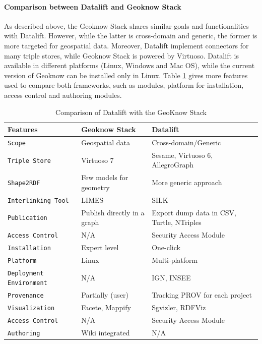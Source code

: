 \paragraph{Comparison between Datalift and Geoknow Stack }
As described above, the Geoknow Stack shares similar goals and functionalities with Datalift. However, while the latter is cross-domain and generic, the former is more targeted for geospatial data. Moreover, Datalift implement connectors for many triple stores, while Geoknow Stack is powered by Virtuoso. Datalift is available in different platforms (Linux, Windows and Mac OS), while the current version of Geoknow can be installed only in Linux. Table \ref{tab:gknow-datalift} gives more features used to compare both frameworks, such as modules, platform for installation, access control and authoring modules.
\begin{table}[ht!bp]
    \small
    \center
    \begin{tabularx}{\textwidth}{@{}llX@{}}
    \toprule
    \textbf{Features} 		& \textbf{Geoknow Stack } &  \textbf{Datalift} \\
    \toprule
    \texttt{Scope} 	& Geospatial data & Cross-domain/Generic\\
    \midrule
    \texttt{Triple Store} & Virtuoso 7 & Sesame, Virtuoso 6, AllegroGraph\\
    \midrule
    \texttt{Shape2RDF} &  Few models for geometry & More generic approach\\
    \midrule
    \texttt{Interlinking Tool} & LIMES & SILK \\
    \midrule
    \texttt{Publication} & Publish directly in a graph & Export dump data in CSV, Turtle, NTriples\\
    \midrule
    \texttt{Access Control} & N/A & Security Access Module\\
    \midrule
    \texttt{Installation} & Expert level & One-click\\
    \midrule
    \texttt{Platform} & Linux & Multi-platform\\
    \midrule
    \texttt{Deployment Environment} & N/A & IGN, INSEE\\
    \midrule
    \texttt{Provenance} & Partially (user) & Tracking PROV for each project\\
    \midrule
    \texttt{Visualization} & Facete, Mappify  & Sgvizler, RDFViz\\
    \midrule
    \texttt{Access Control} & N/A & Security Access Module\\
    \midrule
    \texttt{Authoring} & Wiki integrated & N/A\\
    \bottomrule
    \end{tabularx}
     \caption{Comparison of Datalift with the GeoKnow Stack} \label{tab:gknow-datalift}
    \end{table}

